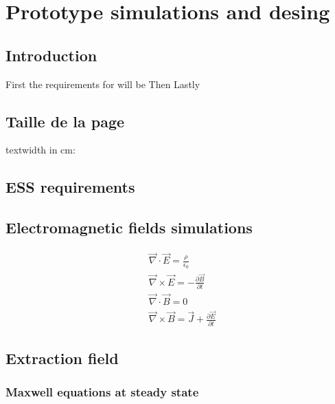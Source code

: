 \chapter{Prototype simulations and desing}
\cleardoublepage[]
\minitoc[]
\section{Introduction}
\begin{refsection}
	\label{ch3:Introduction}
	First the requirements for will be
	Then
	Lastly
	\section{Taille de la page}
	textwidth in cm: \prntlen{\textwidth}
	\section{ESS requirements}
	

	
	\section{Electromagnetic fields simulations}

	\begin{align}
		 & \overrightarrow{\nabla} \cdot \overrightarrow{E} = \frac{\rho}{\epsilon_{0}}                                            \\
		 & \overrightarrow{\nabla} \times \overrightarrow{E} = - \frac{\partial \overrightarrow{B}}{\partial t}                    \\
		 & \overrightarrow{\nabla} \cdot \overrightarrow{B} = 0                                                                    \\
		 & \overrightarrow{\nabla} \times \overrightarrow{B} = \overrightarrow{J} + \frac{\partial \overrightarrow{E}}{\partial t}
	\end{align}

	\section{Extraction field}
	\subsection{Maxwell equations at steady state}

\end{refsection}
